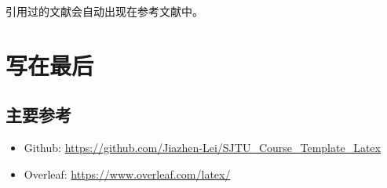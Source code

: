 \documentclass[12pt,hyperref,a4paper,UTF8]{ctexart}
\begin{document}
引用过的文献\cite{Wang2023}会自动出现在参考文献中\cite{Fan2022}。

\section{写在最后}
\subsection{主要参考}
\begin{itemize}
    \item Github: \url{https://github.com/Jiazhen-Lei/SJTU_Course_Template_Latex}
    \item Overleaf:  \url{https://www.overleaf.com/latex/}
\end{itemize}


\end{document}
